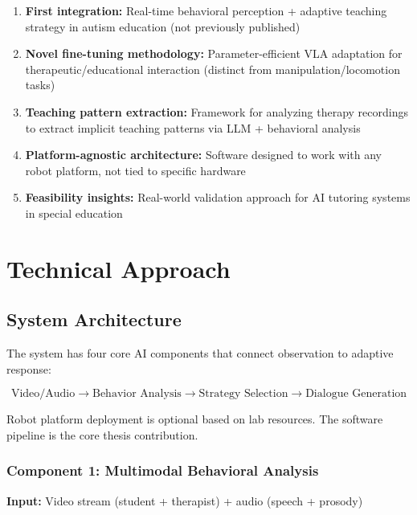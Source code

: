 \documentclass[12pt, a4paper]{article}
\begin{document}
\begin{enumerate}
    \item \textbf{First integration:} Real-time behavioral perception + adaptive teaching strategy in autism education (not previously published)
    \item \textbf{Novel fine-tuning methodology:} Parameter-efficient VLA adaptation for therapeutic/educational interaction (distinct from manipulation/locomotion tasks)
    \item \textbf{Teaching pattern extraction:} Framework for analyzing therapy recordings to extract implicit teaching patterns via LLM + behavioral analysis
    \item \textbf{Platform-agnostic architecture:} Software designed to work with any robot platform, not tied to specific hardware
    \item \textbf{Feasibility insights:} Real-world validation approach for AI tutoring systems in special education
\end{enumerate}

\section{Technical Approach}

\subsection{System Architecture}

The system has four core AI components that connect observation to adaptive response:

\begin{equation}
\text{Video/Audio} \rightarrow \text{Behavior Analysis} \rightarrow \text{Strategy Selection} \rightarrow \text{Dialogue Generation}
\end{equation}

Robot platform deployment is optional based on lab resources. The software pipeline is the core thesis contribution.

\subsubsection{Component 1: Multimodal Behavioral Analysis}

\textbf{Input:} Video stream (student + therapist) + audio (speech + prosody)
\end{document}
